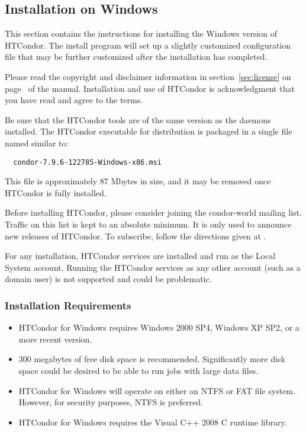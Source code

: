 \subsection{\label{sec:Windows-Install}Installation on Windows}

This section contains the instructions for 
installing the Windows version of HTCondor.  
The install program will set up a slightly customized configuration
file that may be further customized after the installation has completed.

Please read the copyright and disclaimer information in 
section~\ref{sec:license} on
page~\pageref{sec:license} of the manual.
Installation and
use of HTCondor is acknowledgment that you have read and agree to the
terms.

Be sure that the HTCondor tools are of the same version
as the daemons installed.
The HTCondor executable for distribution is packaged in
a single file named similar to:
\begin{verbatim}
  condor-7.9.6-122785-Windows-x86.msi
\end{verbatim}
This file is approximately 87 Mbytes in size, and it may be
removed once HTCondor is fully installed.

Before installing HTCondor, please consider joining the condor-world mailing
list.  Traffic on this list is kept to an absolute minimum.  It is only
used to announce new releases of HTCondor.
To subscribe, follow the directions given at
.

For any installation, HTCondor services are installed and run as the
Local System account.
Running the HTCondor services as any other account (such as a domain user) 
is not supported and could be problematic.
 
\subsubsection{Installation Requirements}

\begin{itemize}

\item HTCondor for Windows requires Windows 2000 SP4, Windows XP SP2, 
or a more recent version.

\item 300 megabytes of free disk space is recommended.  Significantly more 
disk space could be desired to be able to run jobs with large data files.

\item HTCondor for Windows will operate on either an NTFS or FAT file system.  However, for security purposes, NTFS is preferred.

\item HTCondor for Windows requires the Visual C++ 2008 C runtime library.
\end{itemize}

